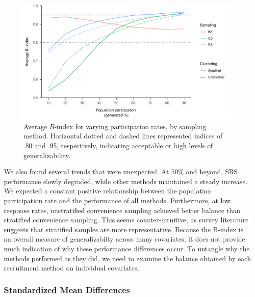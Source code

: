 \documentclass[
  english,
  man,floatsintext]{apa6}
\begin{document}
\begin{figure}
\centering
\includegraphics{6---Paper_files/figure-latex/fig-avg-B-1.pdf}
\caption{\label{fig:fig-avg-B}Average \(B\)-index for varying participation rates, by sampling method. Horizontal dotted and dashed lines represented indices of .80 and .95, respectively, indicating acceptable or high levels of generalizability.}
\end{figure}

We also found several trends that were unexpected. At 50\% and beyond, SBS performance slowly degraded, while other methods maintained a steady increase. We expected a constant positive relationship between the population participation rate and the performance of all methods. Furthermore, at low response rates, unstratified convenience sampling achieved better balance than stratified convenience sampling. This seems counter-intuitive, as survey literature suggests that stratified samples are more representative. Because the B-index is an overall measure of generalizabilty across many covariates, it does not provide much indication of why these performance differences occur. To untangle why the methods performed as they did, we need to examine the balance obtained by each recruitment method on individual covariates.

\hypertarget{standardized-mean-differences}{%
\subsubsection{Standardized Mean Differences}\label{standardized-mean-differences}}
\end{document}
